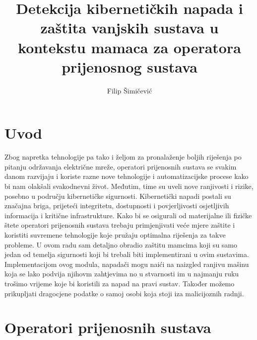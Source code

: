 \documentclass[times, utf8, zavrsni]{fer}
\begin{document}

\title{Detekcija kibernetičkih napada i zaštita vanjskih sustava u kontekstu mamaca za
operatora prijenosnog sustava}

\author{Filip Šimičević}

\maketitle

\izvornik

\zahvala{}

\tableofcontents

\chapter{Uvod}
Zbog napretka tehnologije pa tako i željom za pronalaženje boljih riješenja po pitanju održavanja električne mreže, operatori prijenosnih sustava se svakim danom razvijaju i koriste razne nove tehnologije i automatizacijske procese kako bi nam olakšali svakodnevni život. Međutim, time su uveli nove ranjivosti i rizike, posebno u području kibernetičke sigurnosti. Kibernetički napadi postali su značajna briga, prijeteći integritetu, dostupnosti i povjerljivosti osjetljivih informacija i kritične infrastrukture. Kako bi se osigurali od materijalne ili fizičke štete operatori prijenosnih sustava trebaju primjenjivati veće mjere zaštite i koristiti suvremene tehnologije koje pružaju optimalna riješenja za takve probleme. U ovom radu sam detaljno obradio zaštitu mamcima koji su samo jedan od temelja sigurnosti koji bi trebali biti implementirani u ovim sustavima. Implementacijom ovog modula, napadači mogu naići na naizgled ranjivu mašinu koja se lako podvija njihovm zahtjevima no u stvarnosti im u najmanju ruku trošimo vrijeme koje bi koristili za napad na pravi sustav. Također možemo prikupljati dragocjene podatke o samoj osobi koja stoji iza malicijoznih radnji.

\chapter{Operatori prijenosnih sustava}
\end{document}
